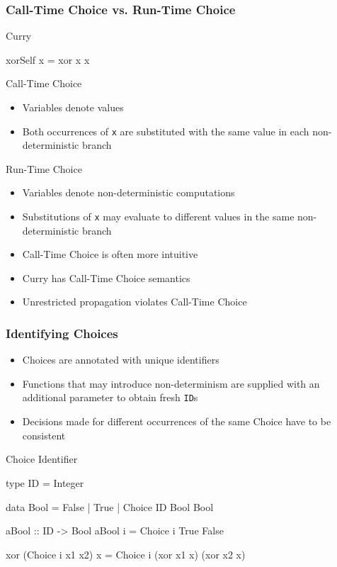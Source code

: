\documentclass[utf8]{beamer}
\newenvironment{program}{\begin{semiverbatim}\small}{\end{semiverbatim}}
\begin{document}
\begin{frame}[fragile]
\frametitle{Call-Time Choice vs. Run-Time Choice}
\begin{block}{Curry}
\begin{program}
xorSelf x = xor x x
\end{program}
\end{block}
\pause
\begin{block}{Call-Time Choice}
\begin{itemize}
\item Variables denote values
\item Both occurrences of {\tt x} are substituted with the same value in each non-deterministic branch
\end{itemize}
\end{block}
\pause
\begin{block}{Run-Time Choice}
\begin{itemize}
\item Variables denote non-deterministic computations
\item Substitutions of {\tt x} may evaluate to different values in the same non-deterministic branch
\end{itemize}
\end{block}
\pause
\begin{itemize}
\item Call-Time Choice is often more intuitive
\item Curry has Call-Time Choice semantics 
\item Unrestricted propagation violates Call-Time Choice
\end{itemize}
\end{frame}


\begin{frame}[fragile]
\frametitle{Identifying Choices}
\begin{itemize}
\item Choices are annotated with unique identifiers
\item Functions that may introduce non-determinism are supplied with an additional parameter to obtain fresh \verb!ID!s
\item Decisions made for different occurrences of the same Choice have to be consistent
\end{itemize}
\pause
\begin{block}{Choice Identifier}
\begin{program}
type ID = Integer

data Bool = False | True | Choice ID Bool Bool

aBool :: ID -> Bool
aBool i = Choice i True False

xor (Choice i x1 x2) x = Choice i (xor x1 x) (xor x2 x)
\end{program}
\end{block}
\end{frame}
\end{document}
